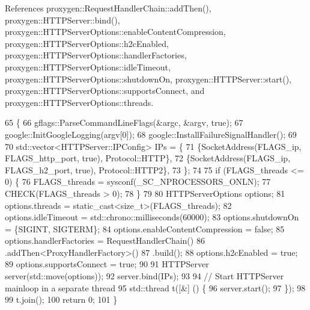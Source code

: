 References proxygen\+::\+Request\+Handler\+Chain\+::add\+Then(), proxygen\+::\+H\+T\+T\+P\+Server\+::bind(), proxygen\+::\+H\+T\+T\+P\+Server\+Options\+::enable\+Content\+Compression, proxygen\+::\+H\+T\+T\+P\+Server\+Options\+::h2c\+Enabled, proxygen\+::\+H\+T\+T\+P\+Server\+Options\+::handler\+Factories, proxygen\+::\+H\+T\+T\+P\+Server\+Options\+::idle\+Timeout, proxygen\+::\+H\+T\+T\+P\+Server\+Options\+::shutdown\+On, proxygen\+::\+H\+T\+T\+P\+Server\+::start(), proxygen\+::\+H\+T\+T\+P\+Server\+Options\+::supports\+Connect, and proxygen\+::\+H\+T\+T\+P\+Server\+Options\+::threads.


\begin{DoxyCode}
65                                  \{
66   gflags::ParseCommandLineFlags(&argc, &argv, \textcolor{keyword}{true});
67   google::InitGoogleLogging(argv[0]);
68   google::InstallFailureSignalHandler();
69 
70   std::vector<HTTPServer::IPConfig> IPs = \{
71     \{SocketAddress(FLAGS\_ip, FLAGS\_http\_port, \textcolor{keyword}{true}), Protocol::HTTP\},
72     \{SocketAddress(FLAGS\_ip, FLAGS\_h2\_port, \textcolor{keyword}{true}), Protocol::HTTP2\},
73   \};
74 
75   \textcolor{keywordflow}{if} (FLAGS\_threads <= 0) \{
76     FLAGS\_threads = sysconf(\_SC\_NPROCESSORS\_ONLN);
77     CHECK(FLAGS\_threads > 0);
78   \}
79 
80   HTTPServerOptions options;
81   options.threads = \textcolor{keyword}{static\_cast<}\textcolor{keywordtype}{size\_t}\textcolor{keyword}{>}(FLAGS\_threads);
82   options.idleTimeout = std::chrono::milliseconds(60000);
83   options.shutdownOn = \{SIGINT, SIGTERM\};
84   options.enableContentCompression = \textcolor{keyword}{false};
85   options.handlerFactories = RequestHandlerChain()
86       .addThen<ProxyHandlerFactory>()
87       .build();
88   options.h2cEnabled = \textcolor{keyword}{true};
89   options.supportsConnect = \textcolor{keyword}{true};
90 
91   HTTPServer server(std::move(options));
92   server.bind(IPs);
93 
94   \textcolor{comment}{// Start HTTPServer mainloop in a separate thread}
95   std::thread t([&] () \{
96     server.start();
97   \});
98 
99   t.join();
100   \textcolor{keywordflow}{return} 0;
101 \}
\end{DoxyCode}
